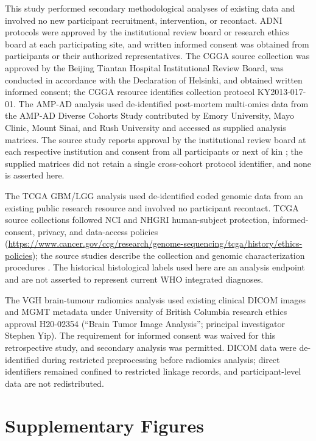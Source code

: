 This study performed secondary methodological analyses of existing data and involved no new participant recruitment, intervention, or recontact. ADNI protocols were approved by the institutional review board or research ethics board at each participating site, and written informed consent was obtained from participants or their authorized representatives. The CGGA source collection was approved by the Beijing Tiantan Hospital Institutional Review Board, was conducted in accordance with the Declaration of Helsinki, and obtained written informed consent; the CGGA resource identifies collection protocol KY2013-017-01. The AMP-AD analysis used de-identified post-mortem multi-omics data from the AMP-AD Diverse Cohorts Study contributed by Emory University, Mayo Clinic, Mount Sinai, and Rush University and accessed as supplied analysis matrices. The source study reports approval by the institutional review board at each respective institution and consent from all participants or next of kin \citep{ref37}; the supplied matrices did not retain a single cross-cohort protocol identifier, and none is asserted here.

The TCGA GBM/LGG analysis used de-identified coded genomic data from an existing public research resource and involved no participant recontact. TCGA source collections followed NCI and NHGRI human-subject protection, informed-consent, privacy, and data-access policies (\url{https://www.cancer.gov/ccg/research/genome-sequencing/tcga/history/ethics-policies}); the source studies describe the collection and genomic characterization procedures \citep{ref44,ref45}. The historical histological labels used here are an analysis endpoint and are not asserted to represent current WHO integrated diagnoses.

The VGH brain-tumour radiomics analysis used existing clinical DICOM images and MGMT metadata under University of British Columbia research ethics approval H20-02354 (``Brain Tumor Image Analysis''; principal investigator Stephen Yip). The requirement for informed consent was waived for this retrospective study, and secondary analysis was permitted. DICOM data were de-identified during restricted preprocessing before radiomics analysis; direct identifiers remained confined to restricted linkage records, and participant-level data are not redistributed.

\section{Supplementary Figures}

